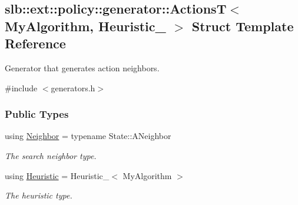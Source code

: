 \hypertarget{structslb_1_1ext_1_1policy_1_1generator_1_1ActionsT}{}\subsection{slb\+:\+:ext\+:\+:policy\+:\+:generator\+:\+:ActionsT$<$ My\+Algorithm, Heuristic\+\_\+ $>$ Struct Template Reference}
\label{structslb_1_1ext_1_1policy_1_1generator_1_1ActionsT}


Generator that generates action neighbors.  




{\ttfamily \#include $<$generators.\+h$>$}

\subsubsection*{Public Types}
\begin{DoxyCompactItemize}
\item 
using \hyperlink{structslb_1_1ext_1_1policy_1_1generator_1_1ActionsT_a7a3f1b03df5a856740e09ab6e455f571}{Neighbor} = typename State\+::\+A\+Neighbor\hypertarget{structslb_1_1ext_1_1policy_1_1generator_1_1ActionsT_a7a3f1b03df5a856740e09ab6e455f571}{}\label{structslb_1_1ext_1_1policy_1_1generator_1_1ActionsT_a7a3f1b03df5a856740e09ab6e455f571}

\begin{DoxyCompactList}\small\item\em The search neighbor type. \end{DoxyCompactList}\item 
using \hyperlink{structslb_1_1ext_1_1policy_1_1generator_1_1ActionsT_aa2fb932f95630f59a094330787f12a7b}{Heuristic} = Heuristic\+\_\+$<$ My\+Algorithm $>$\hypertarget{structslb_1_1ext_1_1policy_1_1generator_1_1ActionsT_aa2fb932f95630f59a094330787f12a7b}{}\label{structslb_1_1ext_1_1policy_1_1generator_1_1ActionsT_aa2fb932f95630f59a094330787f12a7b}

\begin{DoxyCompactList}\small\item\em The heuristic type. \end{DoxyCompactList}\end{DoxyCompactItemize}
